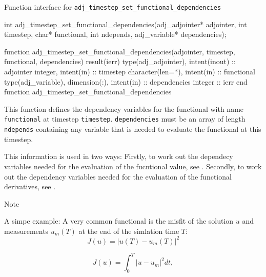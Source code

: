 \begin{boxwithtitle}{Function interface for \texttt{adj_timestep_set_functional_dependencies}}
\begin{minipage}{\columnwidth}
\begin{ccode}
  int adj_timestep_set_functional_dependencies(adj_adjointer* adjointer, 
                   int timestep, char* functional, int ndepends, 
                   adj_variable* dependencies);
\end{ccode}
\begin{fortrancode}
  function adj_timestep_set_functional_dependencies(adjointer, timestep, 
                                  functional, dependencies) result(ierr)
    type(adj_adjointer), intent(inout) :: adjointer
    integer, intent(in) :: timestep
    character(len=*), intent(in) :: functional
    type(adj_variable), dimension(:), intent(in) :: dependencies
    integer :: ierr
  end function adj_timestep_set_functional_dependencies
\end{fortrancode}
\end{minipage}
\end{boxwithtitle}

This function defines the dependency variables for the functional with name \texttt{functional} at timestep \texttt{timestep}.
\texttt{dependencies} must be an array of length \texttt{ndepends} containing any variable that is needed to evaluate the functional at this timestep.

This information is used in two ways: 
Firstly, to work out the dependecy variables needed for the evaluation of the fucntional value, see .
Secondly, to work out the dependency variables needed for the evaluation of the functional derivatives, see .


Note 

A simpe example:
A very common functional is the misfit of the solution $u$ and measurements $u_m(T)$ at the end of the simlation time $T$:
\begin{equation}
J(u) = |u(T) - u_{m}(T)|^2
\label{eq:ex_functional1}
\end{equation}





\begin{equation}
J(u) = \int_0^T |u - u_{m}|^2 dt,
\label{eq:ex_functional1}
\end{equation}

